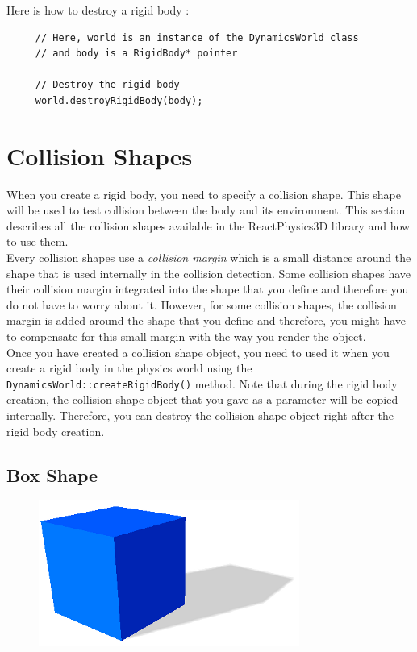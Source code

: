 \documentclass[a4paper,12pt]{article}
\begin{document}
    Here is how to destroy a rigid body : \\

    \begin{lstlisting}
     // Here, world is an instance of the DynamicsWorld class
     // and body is a RigidBody* pointer

     // Destroy the rigid body
     world.destroyRigidBody(body);
  \end{lstlisting}

    \section{Collision Shapes}
    \label{sec:collisionshapes}

    When you create a rigid body, you need to specify a collision shape. This shape will be used to test collision between the body and its environment.
    This section describes all the collision shapes available in the ReactPhysics3D library and how to use them. \\

    Every collision shapes use a \emph{collision margin} which is a small distance around the shape that is used internally in the collision detection.
    Some collision shapes have their collision margin integrated into the shape that you define and therefore you do not have to worry about it.
    However, for some collision shapes, the collision margin is added around the shape that you define and therefore, you might have to compensate
    for this small margin with the way you render the object. \\

    Once you have created a collision shape object, you need to used it when you create a rigid body in the physics world using the
    \texttt{DynamicsWorld::createRigidBody()} method. Note that during the rigid body creation, the collision shape object that you gave as a parameter
    will be copied internally. Therefore, you can destroy the collision shape object right after the rigid body creation.

    \subsection{Box Shape}

    \begin{figure}[h]
        \centering
        \includegraphics{boxshape.png}
        \label{fig:boxshape}
    \end{figure}
\end{document}
